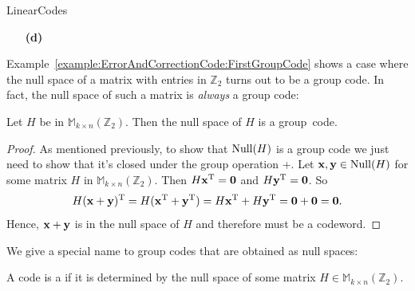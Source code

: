 \begin{exercise}{LinearCodes}
\begin{minipage}[t]{4.6in}
\begin{minipage}[t]{2.25in}
\begin{itemize}
\end{itemize}
\end{minipage} \hfill
\begin{minipage}[t]{2.25in}
\begin{itemize}
 
 \item[{\bf (d)}]
\end{itemize}
\end{minipage}
\end{minipage}




\end{exercise}
 

Example~\ref{example:ErrorAndCorrectionCode:FirstGroupCode} shows a case where the null space of a matrix with entries in $\mathbb{Z}_2$ turns out to be a group code. In fact, the null space of such a matrix  is \emph{always} a group code: 
 
\begin{prop}{}
Let $H$ be in $\mathbb{M}_{k \times n}(\mathbb{Z}_2)$. Then the null space of
$H$ is a group~code.
\end{prop}
  
\begin{proof}
As mentioned previously, to show that ${\rm Null}(H)$  is a group code we just need to show that it's closed under the group operation +. Let ${\bold x},
{\bold y} \in {\rm Null}(H)$ for some matrix $H$ in $\mathbb{M}_{k \times
n}(\mathbb{Z}_2)$. Then $H{\bold x}^{\mathrm{T}} = {\bold 0}$ and $H{\bold y}^{\mathrm{T}} =
{\bold 0}$. So 
\[
H({\bold x}+{\bold y})^{\mathrm{T}} = H({\bold x}^{\mathrm{T}} +{\bold y}^{\mathrm{T}})
=
H{\bold x}^{\mathrm{T}} + H{\bold y}^{\mathrm{T}} = {\bold 0}
+
{\bold 0}
= {\bold 0}.
\]
Hence, ${\bold x}+{\bold y}$ is in the null space of $H$ and
therefore must be a codeword. 
\end{proof}

We give a special name to  group codes that are obtained as null spaces:

\begin{defn}
A code is a  if it is
determined by the null space of some matrix $H \in \mathbb{M}_{k \times
n}(\mathbb{Z}_2)$.  
 \end{defn}
 

